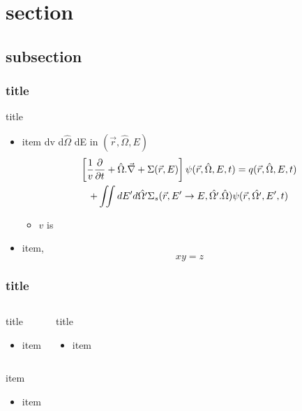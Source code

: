 \documentclass[10pt]{beamer}
\begin{document}
\section{section}

\subsection{subsection}
\begin{frame}
\frametitle{title \cite{book}}
\begin{block}{title}
\begin{itemize}
\item item dv d$\hat{\Omega}$ dE in $(\vec{r}, \hat{\Omega}, E)$
\begin{multline*}
  \left[{1 \over v} {\partial \over \partial t} + \hat{\Omega} . \vec{\nabla} + \Sigma(\vec{r}, E)\right]  \psi(\vec{r}, \hat{\Omega}, E, t) = q(\vec{r}, \hat{\Omega}, E, t)
  \\ + \iint dE' d\hat{\Omega'} \Sigma_s(\vec{r}, E' \rightarrow E, \hat{\Omega'} . \hat{\Omega}) \psi(\vec{r}, \hat{\Omega'}, E', t)
\end{multline*}
\begin{itemize}
\item $v$ is 
\end{itemize}
\item item,
\begin{equation*}
  xy=z
\end{equation*}
\end{itemize}
\end{block}
\end{frame}


\begin{frame}
\frametitle{title}
\begin{columns}[T]
\begin{block}{title}
\begin{itemize}
\item item
\end{itemize}
\end{block}
\begin{block}{title}
\begin{itemize}
\item item
\end{itemize}
\end{block}
\end{columns}
\begin{block}{item}
\begin{itemize}
\item item
\end{itemize}
\end{block}
\end{frame}
\end{document}
